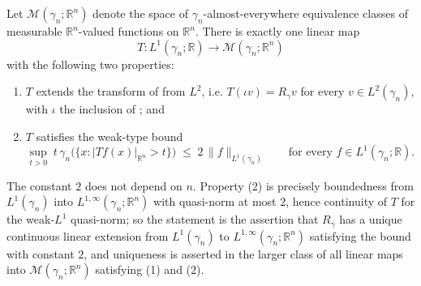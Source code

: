 \begin{theorem}
Let $\mathcal{M}(\gamma_n;\mathbb{R}^n)$ denote the space of
$\gamma_n$-almost-everywhere equivalence classes of measurable
$\mathbb{R}^n$-valued functions on $\mathbb{R}^n$.  There is exactly one linear
map
\[
  T : L^1(\gamma_n;\mathbb{R}) \longrightarrow \mathcal{M}(\gamma_n;\mathbb{R}^n)
\]
with the following two properties:
\begin{enumerate}
\item $T$ extends the transform of  from $L^2$, i.e.
$T(\iota v) = R_\gamma v$ for every $v \in L^2(\gamma_n)$, with $\iota$ the
inclusion of ; and
\item $T$ satisfies the weak-type bound
\[
  \sup_{t>0}\; t\,\gamma_n\bigl(\{x : |Tf(x)|_{\mathbb{R}^n} > t\}\bigr)
    \;\leq\; 2\,\|f\|_{L^1(\gamma_n)}
  \qquad\text{for every } f \in L^1(\gamma_n;\mathbb{R}) .
\]
\end{enumerate}
The constant $2$ does not depend on $n$.  Property (2) is precisely boundedness
from $L^1(\gamma_n)$ into $L^{1,\infty}(\gamma_n;\mathbb{R}^n)$ with quasi-norm at
most $2$, hence continuity of $T$ for the weak-$L^1$ quasi-norm; so the statement
is the assertion that $R_\gamma$ has a unique continuous linear extension from
$L^1(\gamma_n)$ to $L^{1,\infty}(\gamma_n;\mathbb{R}^n)$ satisfying the bound with
constant $2$, and uniqueness is asserted in the larger class of all linear maps
into $\mathcal{M}(\gamma_n;\mathbb{R}^n)$ satisfying (1) and (2).
\end{theorem}

